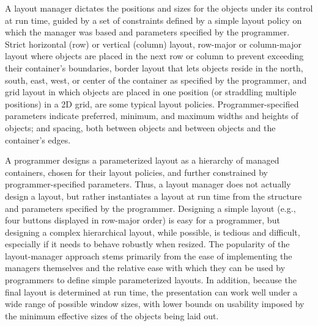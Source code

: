     A layout manager dictates the positions and sizes for the objects under its
    control at run time, guided by a set of constraints defined by a simple
    layout policy on which the manager was based and parameters specified by
    the programmer. Strict horizontal (row) or vertical (column) layout,
    row-major or column-major layout where objects are placed in the next row
    or column to prevent exceeding their container’s boundaries, border layout
    that lets objects reside in the north, south, east, west, or center of the
    container as specified by the programmer, and grid layout in which objects
    are placed in one position (or straddling multiple positions) in a 2D grid,
    are some typical layout policies. Programmer-specified parameters indicate
    preferred, minimum, and maximum widths and heights of objects; and spacing,
    both between objects and between objects and the container’s edges. 


    A programmer designs a parameterized layout as a hierarchy of managed
    containers, chosen for their layout policies, and further constrained by
    programmer-specified parameters. Thus, a layout manager does not actually
    design a layout, but rather instantiates a layout at run time from the
    structure and parameters specified by the programmer. Designing a simple
    layout (e.g., four buttons displayed in row-major order) is easy for a
    programmer, but designing a complex hierarchical layout, while possible, is
    tedious and difficult, especially if it needs to behave robustly when
    resized. The popularity of the layout-manager approach stems primarily from
    the ease of implementing the managers themselves and the relative ease with
    which they can be used by programmers to define simple parameterized
    layouts. In addition, because the final layout is determined at run time,
    the presentation can work well under a wide range of possible window sizes,
    with lower bounds on usability imposed by the minimum effective sizes of
    the objects being laid out.

